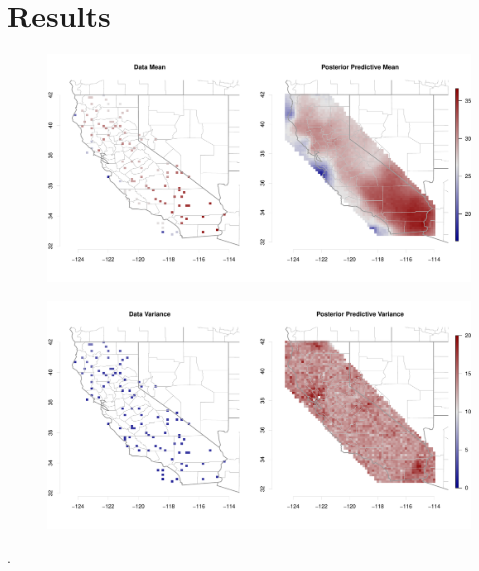 \documentclass{article}
\def\beginmyfig{\begin{figure}[h]\center}
\def\endmyfig{\end{figure}}
\begin{document}
\section{Results}
\beginmyfig
  \includegraphics[scale=.35]{../graphs/postpredmean.pdf}
\endmyfig
\beginmyfig
  \includegraphics[scale=.35]{../graphs/postpredvar.pdf}
\endmyfig

\cite{sdp}. 


\end{document}
